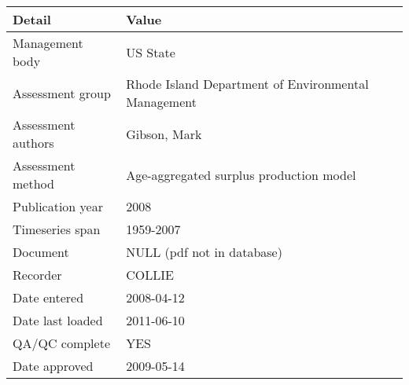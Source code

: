\begin{table}[htb]
\centering
\begin{tabular}{lp{7cm}}
\toprule
Detail & Value \\
\midrule
Management body    & US State                                            \\
Assessment group   & Rhode Island Department of Environmental Management \\
Assessment authors & Gibson, Mark                                        \\
Assessment method  & Age-aggregated surplus production model             \\
Publication year   & 2008                                                \\
Timeseries span    & 1959-2007                                           \\
Document           & NULL (pdf not in database)                          \\
Recorder           & COLLIE                                              \\
Date entered       & 2008-04-12                                          \\
Date last loaded   & 2011-06-10                                          \\
QA/QC complete     & YES                                                 \\
Date approved      & 2009-05-14                                          \\
\bottomrule
\end{tabular}
\label{tab:assessdet}
\end{table}
